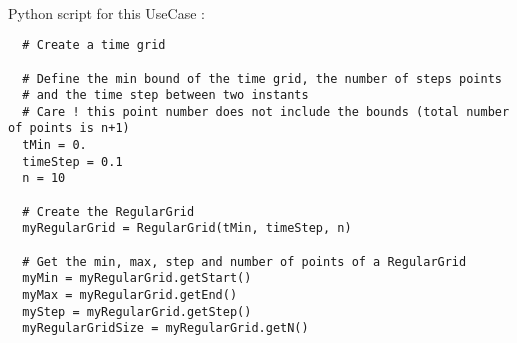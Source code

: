 \textspace\\
Python script for this UseCase :

\begin{lstlisting}
  # Create a time grid

  # Define the min bound of the time grid, the number of steps points
  # and the time step between two instants
  # Care ! this point number does not include the bounds (total number of points is n+1)
  tMin = 0.
  timeStep = 0.1
  n = 10

  # Create the RegularGrid
  myRegularGrid = RegularGrid(tMin, timeStep, n)

  # Get the min, max, step and number of points of a RegularGrid
  myMin = myRegularGrid.getStart()
  myMax = myRegularGrid.getEnd()
  myStep = myRegularGrid.getStep()
  myRegularGridSize = myRegularGrid.getN()


\end{lstlisting}



